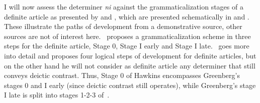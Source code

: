 \documentclass[output=paper
,modfonts
,nonflat]{langsci/langscibook}
\begin{document}
I will now assess the determiner \textit{ni} against the grammaticalization stages of a definite article as presented by \citet[61--74]{Greenberg1978howgender} and \citet[84--86]{Hawkins2004}, which are presented schematically in  and . These illustrate the paths of development from a demonstrative source, other sources are not of interest here.~\cite{Greenberg1978howgender} proposes a grammaticalization scheme in three steps for the definite article, Stage 0, Stage I early and Stage I late.~\cite{Hawkins2004} goes more into detail and proposes four logical steps of development for definite articles, but on the other hand he will not consider as definite article any determiner that still conveys deictic contrast. Thus, Stage 0 of Hawkins encompasses Greenberg's stages 0 and I early (since deictic contrast still operates), while Greenberg's stage I late is split into stages 1-2-3 of~\cite{Hawkins2004}.

\begin{table}[]
	\centering
	\caption{Article grammaticalization stages~\citep{Greenberg1978howgender}}
	\label{tab:pico:5}
\end{table}
\end{document}
